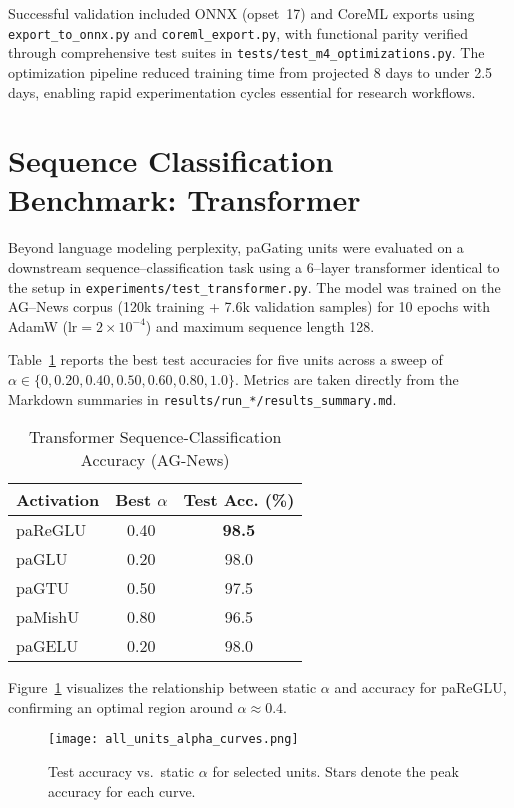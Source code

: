 \documentclass[lettersize,journal]{IEEEtran}
\begin{document}
Successful validation included ONNX (opset~17) and CoreML exports using \texttt{export\_to\_onnx.py} and \texttt{coreml\_export.py}, with functional parity verified through comprehensive test suites in \texttt{tests/test\_m4\_optimizations.py}. The optimization pipeline reduced training time from projected 8 days to under 2.5 days, enabling rapid experimentation cycles essential for research workflows.

\section{Sequence Classification Benchmark: Transformer}
\label{sec:transformer}

Beyond language modeling perplexity, paGating units were evaluated on a downstream 
sequence–classification task using a 6–layer transformer identical to the setup in 
\texttt{experiments/test\_transformer.py}.  The model was trained on the AG–News corpus 
(120k training + 7.6k validation samples) for 10 epochs with AdamW ($\text{lr}=2\times10^{-4}$) and maximum sequence length 128.

Table~\ref{tab:transformer_results} reports the best test accuracies for five units across a sweep of $\alpha\in\{0,0.20,0.40,0.50,0.60,0.80,1.0\}$.  Metrics are taken directly from the Markdown summaries in \texttt{results/run\_*/results\_summary.md}.

\begin{table}[!t]
\caption{Transformer Sequence-Classification Accuracy (AG-News)}
\label{tab:transformer_results}
\centering
\begin{tabular}{|l|c|c|}
\hline
\textbf{Activation} & \textbf{Best $\alpha$} & \textbf{Test Acc. (\%)} \\
\hline
paReGLU & 0.40 & \textbf{98.5} \\
paGLU & 0.20 & 98.0 \\
paGTU & 0.50 & 97.5 \\
paMishU & 0.80 & 96.5 \\
paGELU & 0.20 & 98.0 \\
\hline
\end{tabular}
\end{table}

Figure~\ref{fig:alpha_curve} visualizes the relationship between static $\alpha$ and accuracy for paReGLU, confirming an optimal region around $\alpha\approx0.4$.

\begin{figure}[!t]
\centering
\texttt{[image: all\_units\_alpha\_curves.png]}
\caption{Test accuracy vs.~static $\alpha$ for selected units.  Stars denote the peak accuracy for each curve.}
\label{fig:alpha_curve}
\end{figure}
\end{document}
